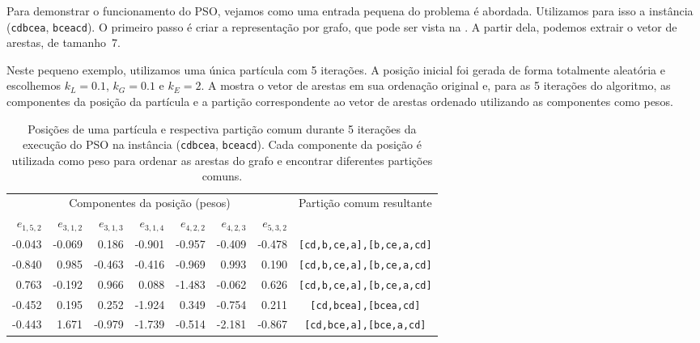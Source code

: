     Para demonstrar o funcionamento do PSO, vejamos como uma entrada pequena do problema é abordada. Utilizamos para isso a instância (\texttt{cdbcea}, \texttt{bceacd}). O primeiro passo é criar a representação por grafo, que pode ser vista na . A partir dela, podemos extrair o vetor de arestas, de tamanho~7.

    Neste pequeno exemplo, utilizamos uma única partícula com 5 iterações. A posição inicial foi gerada de forma totalmente aleatória e escolhemos $k_L = 0.1$, $k_G = 0.1$ e $k_E = 2$. A  mostra o vetor de arestas em sua ordenação original e, para as 5 iterações do algoritmo, as componentes da posição da partícula e a partição correspondente ao vetor de arestas ordenado utilizando as componentes como pesos.

    \begin{table}[htb]
        \centering
        \begin{tabular}{rrrrrrr|c}
            \toprule
            \multicolumn{7}{c|}{Componentes da posição (pesos)} & \multirow{2}{*}{Partição comum resultante} \\
            $e_{1,5,2}$ & $e_{3,1,2}$ & $e_{3,1,3}$ & $e_{3,1,4}$ & $e_{4,2,2}$ & $e_{4,2,3}$ & $e_{5,3,2}$ & \\
            \midrule
            -0.043 & -0.069 & 0.186 & -0.901 & -0.957 & -0.409 & -0.478 & \texttt{[cd,b,ce,a],[b,ce,a,cd]} \\
            -0.840 & 0.985 & -0.463 & -0.416 & -0.969 & 0.993 & 0.190 & \texttt{[cd,b,ce,a],[b,ce,a,cd]} \\
            0.763 & -0.192 & 0.966 & 0.088 & -1.483 & -0.062 & 0.626 & \texttt{[cd,b,ce,a],[b,ce,a,cd]} \\
            -0.452 & 0.195 & 0.252 & -1.924 & 0.349 & -0.754 & 0.211 & \texttt{[cd,bcea],[bcea,cd]} \\
            -0.443 & 1.671 & -0.979 & -1.739 & -0.514 & -2.181 & -0.867 & \texttt{[cd,bce,a],[bce,a,cd]} \\
            \bottomrule
        \end{tabular}

        \caption{Posições de uma partícula e respectiva partição comum durante 5 iterações da execução do PSO na instância (\texttt{cdbcea}, \texttt{bceacd}). Cada componente da posição é utilizada como peso para ordenar as arestas do grafo e encontrar diferentes partições comuns.}
        \label{tab:pso-ex}
    \end{table}

